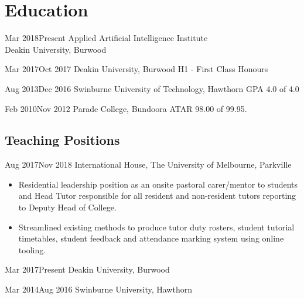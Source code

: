 \section{Education}

\begin{multicols}{2}

{Mar 2018}{Present}
{Applied Artificial Intelligence Institute\\Deakin University, Burwood}
{}

\vspace{-1em}
{Mar 2017}{Oct 2017}
{Deakin University, Burwood}
{H1 - First Class Honours}

\columnbreak

{Aug 2013}{Dec 2016}
{Swinburne University of Technology, Hawthorn}
{GPA 4.0 of 4.0}

{Feb 2010}{Nov 2012}
{Parade College, Bundoora}
{ATAR 98.00 of 99.95.}

\end{multicols}

\subsection{Teaching Positions}

{Aug 2017}{Nov 2018}
{International House, The University of Melbourne, Parkville}
{}
{}
\vspace{-1\bigskipamount}
\small
\begin{itemize}
  \item Residential leadership position as an onsite pastoral carer/mentor to students and Head Tutor responsible for all resident and non-resident tutors reporting to Deputy Head of College.
  \item Streamlined existing methods to produce tutor duty rosters, student tutorial timetables, student feedback and attendance marking system using online tooling.
\end{itemize}

\begin{multicols}{2}

{Mar 2017}{Present}
{Deakin University, Burwood}
{}
{}

{Mar 2014}{Aug 2016}
{Swinburne University, Hawthorn}
{}
{}
\end{multicols}

\vspace{-1\bigskipamount}

